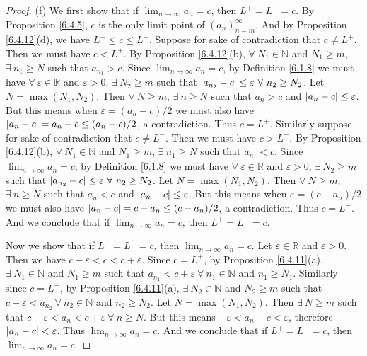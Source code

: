 \begin{proof}{(f)}
We first show that if \(\lim_{n \to \infty} a_n = c\), then \(L^+ = L^- = c\).
By Proposition \ref{6.4.5}, \(c\) is the only limit point of \((a_n)_{n = m}^\infty\).
And by Proposition \ref{6.4.12}(d), we have \(L^- \leq c \leq L^+\).
Suppose for sake of contradiction that \(c \neq L^+\).
Then we must have \(c < L^+\).
By Proposition \ref{6.4.12}(b), \(\forall\ N_1 \in \mathds{N}\) and \(N_1 \geq m\), \(\exists\ n_1 \geq N\) such that \(a_{n_1} > c\).
Since \(\lim_{n \to \infty} a_n = c\), by Definition \ref{6.1.8} we must have \(\forall\ \varepsilon \in \mathds{R}\) and \(\varepsilon > 0\), \(\exists\ N_2 \geq m\) such that \(\abs*{a_{n_2} - c} \leq \varepsilon \ \forall\ n_2 \geq N_2\).
Let \(N = \max(N_1, N_2)\).
Then \(\forall\ N \geq m\), \(\exists\ n \geq N\) such that \(a_n > c\) and \(\abs*{a_n - c} \leq \varepsilon\).
But this means when \(\varepsilon = (a_n - c) / 2\) we must also have \(\abs*{a_n - c} = a_n - c \leq (a_n - c) / 2\), a contradiction.
Thus \(c = L^+\).
Similarly suppose for sake of contradiction that \(c \neq L^-\).
Then we must have \(c > L^-\).
By Proposition \ref{6.4.12}(b), \(\forall\ N_1 \in \mathds{N}\) and \(N_1 \geq m\), \(\exists\ n_1 \geq N\) such that \(a_{n_1} < c\).
Since \(\lim_{n \to \infty} a_n = c\), by Definition \ref{6.1.8} we must have \(\forall\ \varepsilon \in \mathds{R}\) and \(\varepsilon > 0\), \(\exists\ N_2 \geq m\) such that \(\abs*{a_{n_2} - c} \leq \varepsilon \ \forall\ n_2 \geq N_2\).
Let \(N = \max(N_1, N_2)\).
Then \(\forall\ N \geq m\), \(\exists\ n \geq N\) such that \(a_n < c\) and \(\abs*{a_n - c} \leq \varepsilon\).
But this means when \(\varepsilon = (c - a_n) / 2\) we must also have \(\abs*{a_n - c} = c - a_n \leq (c - a_n) / 2\), a contradiction.
Thus \(c = L^-\).
And we conclude that if \(\lim_{n \to \infty} a_n = c\), then \(L^+ = L^- = c\).

Now we show that if \(L^+ = L^- = c\), then \(\lim_{n \to \infty} a_n = c\).
Let \(\varepsilon \in \mathds{R}\) and \(\varepsilon > 0\).
Then we have \(c - \varepsilon < c < c + \varepsilon\).
Since \(c = L^+\), by Proposition \ref{6.4.11}(a), \(\exists\ N_1 \in \mathds{N}\) and \(N_1 \geq m\) such that \(a_{n_1} < c + \varepsilon \ \forall\ n_1 \in \mathds{N}\) and \(n_1 \geq N_1\).
Similarly since \(c = L^-\), by Proposition \ref{6.4.11}(a), \(\exists\ N_2 \in \mathds{N}\) and \(N_2 \geq m\) such that \(c - \varepsilon < a_{n_2} \ \forall\ n_2 \in \mathds{N}\) and \(n_2 \geq N_2\).
Let \(N = \max(N_1, N_2)\).
Then \(\exists\ N \geq m\) such that \(c - \varepsilon < a_n < c + \varepsilon \ \forall\ n \geq N\).
But this means \(-\varepsilon < a_n - c < \varepsilon\), therefore \(\abs*{a_n - c} < \varepsilon\).
Thus \(\lim_{n \to \infty} a_n = c\).
And we conclude that if \(L^+ = L^- = c\), then \(\lim_{n \to \infty} a_n = c\).
\end{proof}

